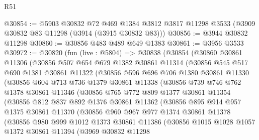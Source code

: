 \begin{lexlean}{R51}
\begin{coremodule}
@30854 := @5903
    @30832
    @72
    @469
    @1384
    @3812
    @3817
    @11298
    @3533
    (@3909 @30832 @83 @11298 (@3914 (@3915 @30832 @83)))
@30856 := @3944 @30832 @11298
@30860 := @30856 @483 @489 @649 @1383
@30861 := @3956 @3533
@30972 := @30820
    (fun (live : @5804) =>
    @30838
      (@30854
        (@30860
          @30861
          @11306
          (@30856
            @507
            @654
            @679
            @1382
            @30861
            @11314
            (@30856
              @545
              @517
              @690
              @1381
              @30861
              @11322
              (@30856
                @596
                @696
                @706
                @1380
                @30861
                @11330
                (@30856
                  @604
                  @713
                  @736
                  @1379
                  @30861
                  @11338
                  (@30856
                    @739
                    @746
                    @762
                    @1378
                    @30861
                    @11346
                    (@30856
                      @765
                      @772
                      @809
                      @1377
                      @30861
                      @11354
                      (@30856
                        @812
                        @837
                        @892
                        @1376
                        @30861
                        @11362
                        (@30856
                          @895
                          @914
                          @957
                          @1375
                          @30861
                          @11370
                          (@30856
                            @960
                            @967
                            @977
                            @1374
                            @30861
                            @11378
                            (@30856
                              @980
                              @999
                              @1012
                              @1373
                              @30861
                              @11386
                              (@30856
                                @1015
                                @1028
                                @1057
                                @1372
                                @30861
                                @11394
                                (@3969
                                  @30832
                                  @11298

\end{coremodule}
\end{lexlean}
